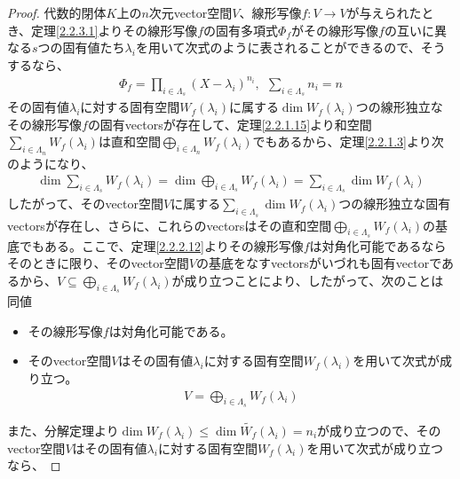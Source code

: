 \documentclass[dvipdfmx]{jsarticle}
\begin{document}
\begin{proof}
代数的閉体$K$上の$n$次元vector空間$V$、線形写像$f:V \rightarrow V$が与えられたとき、定理\ref{2.2.3.1}よりその線形写像$f$の固有多項式$\varPhi_{f}$がその線形写像$f$の互いに異なる$s$つの固有値たち$\lambda_{i}$を用いて次式のように表されることができるので、そうするなら、
\begin{align*}
\varPhi_{f} = \prod_{i \in \varLambda_{s}} \left( X - \lambda_{i} \right)^{n_{i}},\ \ \sum_{i \in \varLambda_{s}} n_{i} = n
\end{align*}
その固有値$\lambda_{i}$に対する固有空間$W_{f}\left( \lambda_{i} \right)$に属する$\dim{W_{f}\left( \lambda_{i} \right)}$つの線形独立なその線形写像$f$の固有vectorsが存在して、定理\ref{2.2.1.15}より和空間$\sum_{i \in \varLambda_{n}} {W_{f}\left( \lambda_{i} \right)}$は直和空間$\bigoplus_{i \in \varLambda_{n}} {W_{f}\left( \lambda_{i} \right)}$でもあるから、定理\ref{2.2.1.3}より次のようになり、
\begin{align*}
\dim{\sum_{i \in \varLambda_{s}} {W_{f}\left( \lambda_{i} \right)}} = \dim{\bigoplus_{i \in \varLambda_{s}} {W_{f}\left( \lambda_{i} \right)}} = \sum_{i \in \varLambda_{s}} {\dim{W_{f}\left( \lambda_{i} \right)}}
\end{align*}
したがって、そのvector空間$V$に属する$\sum_{i \in \varLambda_{s}} {\dim{W_{f}\left( \lambda_{i} \right)}}$つの線形独立な固有vectorsが存在し、さらに、これらのvectorsはその直和空間$\bigoplus_{i \in \varLambda_{s}} {W_{f}\left( \lambda_{i} \right)}$の基底でもある。ここで、定理\ref{2.2.2.12}よりその線形写像$f$は対角化可能であるならそのときに限り、そのvector空間$V$の基底をなすvectorsがいづれも固有vectorであるから、$V \subseteq \bigoplus_{i \in \varLambda_{s}} {W_{f}\left( \lambda_{i} \right)}$が成り立つことにより、したがって、次のことは同値
\begin{itemize}
\item
  その線形写像$f$は対角化可能である。
\item
  そのvector空間$V$はその固有値$\lambda_{i}$に対する固有空間$W_{f}\left( \lambda_{i} \right)$を用いて次式が成り立つ。
\begin{align*}
V = \bigoplus_{i \in \varLambda_{s}} {W_{f}\left( \lambda_{i} \right)}
\end{align*}
\end{itemize}
\par
また、分解定理より$\dim{W_{f}\left( \lambda_{i} \right)} \leq \dim{\widetilde{W_{f}}\left( \lambda_{i} \right)} = n_{i}$が成り立つので、そのvector空間$V$はその固有値$\lambda_{i}$に対する固有空間$W_{f}\left( \lambda_{i} \right)$を用いて次式が成り立つなら、

\end{proof}
\end{document}
